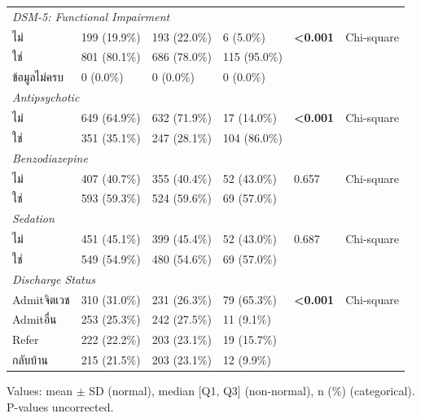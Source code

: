 \begin{table}[htbp]
\begin{tabular}{llllll}
\multicolumn{6}{l}{\textit{DSM-5: Functional Impairment}} \\
\quad ไม่ & 199 (19.9\%) & 193 (22.0\%) & 6 (5.0\%) & \textbf{<0.001} & Chi-square \\
\quad ใช่ & 801 (80.1\%) & 686 (78.0\%) & 115 (95.0\%) &  &  \\
\quad ข้อมูลไม่ครบ & 0 (0.0\%) & 0 (0.0\%) & 0 (0.0\%) &  &  \\
\multicolumn{6}{l}{\textit{Antipsychotic}} \\
\quad ไม่ & 649 (64.9\%) & 632 (71.9\%) & 17 (14.0\%) & \textbf{<0.001} & Chi-square \\
\quad ใช่ & 351 (35.1\%) & 247 (28.1\%) & 104 (86.0\%) &  &  \\
\multicolumn{6}{l}{\textit{Benzodiazepine}} \\
\quad ไม่ & 407 (40.7\%) & 355 (40.4\%) & 52 (43.0\%) & 0.657 & Chi-square \\
\quad ใช่ & 593 (59.3\%) & 524 (59.6\%) & 69 (57.0\%) &  &  \\
\multicolumn{6}{l}{\textit{Sedation}} \\
\quad ไม่ & 451 (45.1\%) & 399 (45.4\%) & 52 (43.0\%) & 0.687 & Chi-square \\
\quad ใช่ & 549 (54.9\%) & 480 (54.6\%) & 69 (57.0\%) &  &  \\
\multicolumn{6}{l}{\textit{Discharge Status}} \\
\quad Admitจิตเวช & 310 (31.0\%) & 231 (26.3\%) & 79 (65.3\%) & \textbf{<0.001} & Chi-square \\
\quad Admitอื่น & 253 (25.3\%) & 242 (27.5\%) & 11 (9.1\%) &  &  \\
\quad Refer & 222 (22.2\%) & 203 (23.1\%) & 19 (15.7\%) &  &  \\
\quad กลับบ้าน & 215 (21.5\%) & 203 (23.1\%) & 12 (9.9\%) &  &  \\
\bottomrule
\end{tabular}
\begin{flushleft}
\small
Values: mean $\pm$ SD (normal), median [Q1, Q3] (non-normal), n (\%) (categorical). P-values uncorrected.
\end{flushleft}
\end{table}